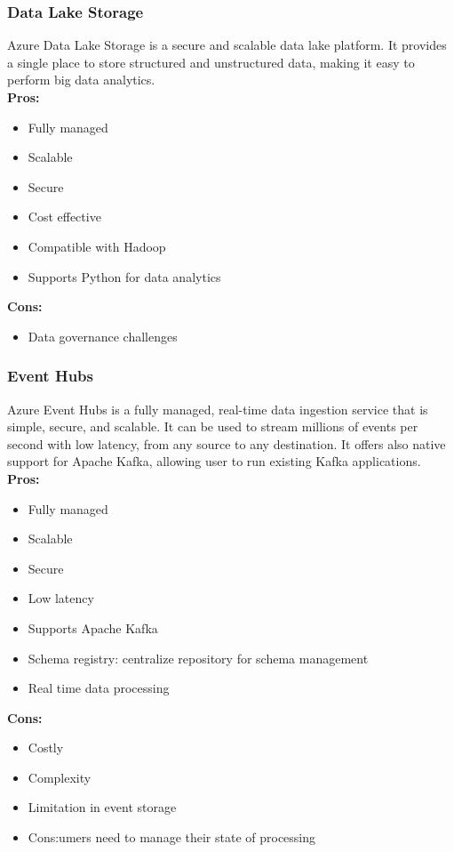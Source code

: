         \subsubsection{Data Lake Storage}
        \label{azure:data-lake-storage}
        Azure Data Lake Storage is a secure and scalable data lake platform. It provides a single place to store structured and unstructured data, making it easy to perform big data analytics.\\
        \textbf{Pros:}
        \begin{itemize}
            \item Fully managed
            \item Scalable
            \item Secure
            \item Cost effective
            \item Compatible with Hadoop
            \item Supports Python for data analytics
        \end{itemize}
        \textbf{Cons:}
        \begin{itemize}
            \item Data governance challenges
        \end{itemize}

        \subsubsection{Event Hubs}
        \label{azure:event-hubs}
        Azure Event Hubs is a fully managed, real-time data ingestion service that is simple, secure, and scalable. It can be used to stream millions of events per second with low latency, from any source to any destination. It offers also native support for Apache Kafka, allowing user to run existing Kafka applications.\\
        \textbf{Pros:}
        \begin{itemize}
            \item Fully managed
            \item Scalable
            \item Secure
            \item Low latency
            \item Supports Apache Kafka
            \item Schema registry: centralize repository for schema management
            \item Real time data processing
        \end{itemize}
        \textbf{Cons:}
        \begin{itemize}
            \item Costly
            \item Complexity
            \item Limitation in event storage
            \item Cons:umers need to manage their state of processing
        \end{itemize}

